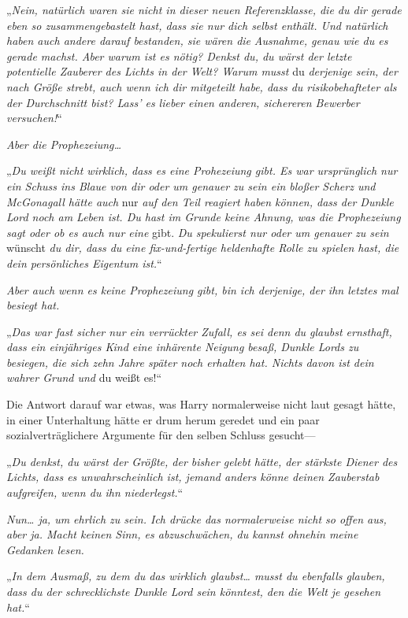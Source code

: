 {„\emph{Nein, natürlich waren sie nicht in dieser neuen Referenzklasse, die du dir gerade eben so zusammengebastelt hast, dass sie nur dich selbst enthält. Und natürlich haben auch andere darauf bestanden, sie wären die} \emph{Ausnahme, genau wie du es gerade machst. Aber warum ist es nötig? Denkst du, du wärst der letzte potentielle Zauberer des Lichts in der Welt? Warum musst} du \emph{derjenige sein, der nach Größe strebt, auch wenn ich dir mitgeteilt habe, dass du risikobehafteter als der Durchschnitt bist? Lass' es lieber einen anderen, sichereren Bewerber versuchen!}“

\emph{Aber die Prophezeiung…}

„\emph{Du weißt nicht wirklich, dass es eine Prohezeiung gibt. Es war ursprünglich nur ein Schuss ins Blaue von dir oder um genauer zu sein ein bloßer Scherz und McGonagall hätte auch} nur \emph{auf den Teil reagiert haben können, dass der Dunkle Lord noch am Leben ist. Du hast im Grunde keine Ahnung, was die Prophezeiung sagt oder ob es auch nur eine} gibt. \emph{Du spekulierst nur oder um genauer zu sein} wünscht \emph{du dir, dass du eine fix-und-fertige heldenhafte Rolle zu spielen hast, die dein persönliches Eigentum ist.}“

\emph{Aber auch wenn es keine Prophezeiung gibt, bin ich derjenige, der ihn letztes mal besiegt hat.}

„\emph{Das war fast sicher nur ein verrückter Zufall, es sei denn du glaubst ernsthaft, dass ein einjähriges Kind eine inhärente Neigung besaß, Dunkle Lords zu besiegen, die sich zehn Jahre später noch erhalten hat. Nichts davon ist dein wahrer Grund und} du weißt es!\emph{}“

Die Antwort darauf war etwas, was Harry normalerweise nicht laut gesagt hätte, in einer Unterhaltung hätte er drum herum geredet und ein paar sozialverträglichere Argumente für den selben Schluss gesucht—

„\emph{Du denkst, du wärst der Größte, der bisher gelebt hätte, der stärkste Diener des Lichts, dass es unwahrscheinlich ist, jemand anders könne deinen Zauberstab aufgreifen, wenn du ihn niederlegst.}“

\emph{Nun… ja, um ehrlich zu sein. Ich drücke das normalerweise nicht so offen aus, aber ja. Macht keinen Sinn, es abzuschwächen, du kannst ohnehin meine Gedanken lesen.}

„\emph{In dem Ausmaß, zu dem du das wirklich glaubst… musst du ebenfalls glauben, dass du der schrecklichste Dunkle Lord sein könntest, den die Welt je gesehen hat.}“

}
